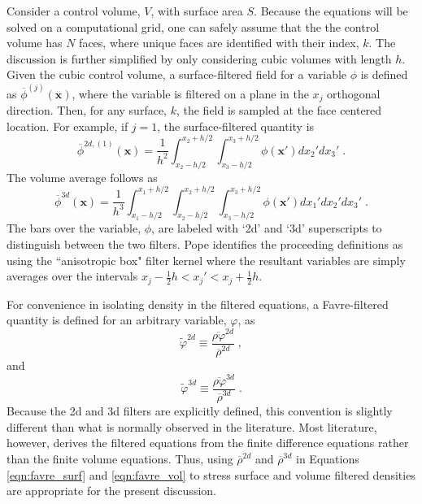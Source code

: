 Consider a control volume, $V$, with surface area $S$.  Because the equations will be  solved on a computational grid, one can safely assume that the the control volume has $N$ faces, where unique faces are identified with their index, $k$.  The discussion is further simplified by only considering cubic volumes with length $h$.  
Given the cubic control volume, a surface-filtered field for a variable $\phi$ is defined as $\overline{\phi}^{(j)}(\mathbf{x})$, where the variable is filtered on a plane in the $x_j$ orthogonal direction.  Then, for any surface, $k$, the field is sampled at the face centered location.  For example, if $j=1$, the surface-filtered quantity is
%
\begin{equation}
\overline{\phi}^{2d, (1)}(\mathbf x) = \frac{1}{h^2} \int_{x_2 - h/2}^{x_2 + h/2}  \int_{x_3 - h/2}^{x_3 + h/2} \phi(\mathbf x') dx_2' dx_3' \; .
\end{equation} 
%
The volume average follows as
%
\begin{equation}
\overline{\phi}^{3d} (\mathbf x) = \frac{1}{h^3} \int_{x_1 - h/2}^{x_1 + h/2} \int_{x_2 - h/2}^{x_2 + h/2}  \int_{x_3 - h/2}^{x_3 + h/2} \phi(\mathbf x') dx_1' dx_2' dx_3' \; .
\end{equation}
%
The bars over the variable, $\phi$, are labeled with `2d' and `3d' superscripts to distinguish between the two filters.  Pope \cite{Pope179} identifies the proceeding definitions as using the ``anisotropic box" filter kernel where the resultant variables are simply averages over the intervals $x_j - \frac{1}{2}h < x_j' < x_j + \frac{1}{2}h$. 

For convenience in isolating density in the filtered equations, a Favre-filtered quantity is defined for an arbitrary variable, $\varphi$, as 
%
\begin{equation}\label{eqn:favre_surf}
\widetilde{\varphi}^{2d} \equiv \frac{\overline{\rho \varphi}^{2d}}{\overline{\rho}^{2d}} \; ,
\end{equation}
%
and
%
\begin{equation}\label{eqn:favre_vol}
\widetilde{\varphi}^{3d} \equiv \frac{\overline{\rho \varphi}^{3d}}{\overline{\rho}^{3d}} \;.
\end{equation}
%
Because the 2d and 3d filters are explicitly defined, this convention is slightly different than what is normally observed in the literature.  Most literature, however, derives the filtered equations from the finite difference equations rather than the finite volume equations.  Thus, using $\overline{\rho}^{2d}$ and $\overline{\rho}^{3d}$ in Equations \ref{eqn:favre_surf} and \ref{eqn:favre_vol} to stress surface and volume filtered densities are appropriate for the present discussion.

